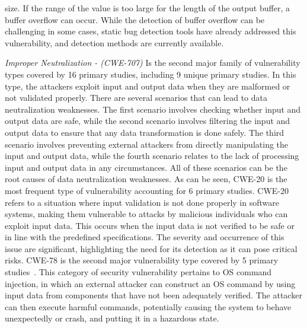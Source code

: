 size. If the range of the value is too large for the length of the output buffer, a buffer overflow can occur. While the detection of buffer overflow can be challenging in some cases, static bug detection tools have already addressed this vulnerability, and detection methods are currently available. 



\textit{Improper Neutralization - (CWE-707)} 
Is the second major family of vulnerability types covered by 16 primary studies, including 9 unique primary studies. In this type, the attackers exploit input and output data when they are malformed or not validated properly. There are several scenarios that can lead to data neutralization weaknesses. The first scenario involves checking whether input and output data are safe, while the second scenario involves filtering the input and output data to ensure that any data transformation is done safely. The third scenario involves preventing external attackers from directly manipulating the input and output data, while the fourth scenario relates to the lack of processing input and output data in any circumstances. All of these scenarios can be the root causes of data neutralization weaknesses. As can be seen, CWE-20 is the most frequent type of vulnerability accounting for 6 primary studies. CWE-20 refers to a situation where input validation is not done properly in software systems, making them vulnerable to attacks by malicious individuals who can exploit input data. This occurs when the input data is not verified to be safe or in line with the predefined specifications. The severity and occurrence of this issue are significant, highlighting the need for its detection as it can pose critical risks. CWE-78 is the second major vulnerability type covered by 5 primary studies~\cite{wang2020combining, cheng2021deepwukong, ghaffarian2021neural, li2021vuldeelocator, yang2022source}. This category of security vulnerability pertains to OS command injection, in which an external attacker can construct an OS command by using input data from components that have not been adequately verified. The attacker can then execute harmful commands, potentially causing the system to behave unexpectedly or crash, and putting it in a hazardous state.

